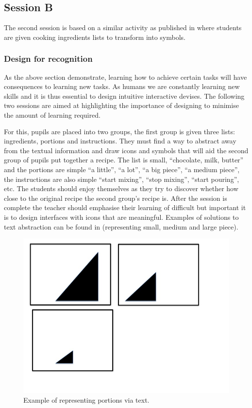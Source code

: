 \documentclass{sig-alternate}
\begin{document}
\subsection{Session B}

The second session is based on a similar activity as published in
\cite{fellows2005} where students are given cooking ingredients lists
to transform into symbols.

\subsubsection*{Design for recognition}
 
As the above section demonstrate, learning how to achieve certain
tasks will have consequences to learning new tasks. As humans we are
constantly learning new skills and it is thus essential to design
intuitive interactive devises. The following two sessions are aimed at
highlighting the importance of designing to minimise the amount of
learning required.

For this, pupils are placed into two groups, the first group is given
three lists: ingredients, portions and instructions. They must find a
way to abstract away from the textual information and draw icons and
symbols that will aid the second group of pupils put together a
recipe. The list is small, ``chocolate, milk, butter'' and the portions
are simple ``a little'', ``a lot'', ``a big piece'', ``a medium piece'', the
instructions are also simple ``start mixing'', ``stop mixing'', ``start
pouring'', etc. The students should enjoy themselves as they try to
discover whether how close to the original recipe the second group's
recipe is. After the session is complete the teacher should emphasise
their learning of difficult but important it is to design interfaces
with icons that are meaningful. Examples of solutions to text
abstraction can be found in \cite{fig1} (representing small, medium
and large piece).


\begin{figure}
  \includegraphics[width=\columnwidth]{images/portions.jpg}
  \caption{Example of representing portions via text.}\label{fig1}
\end{figure}
\end{document}
